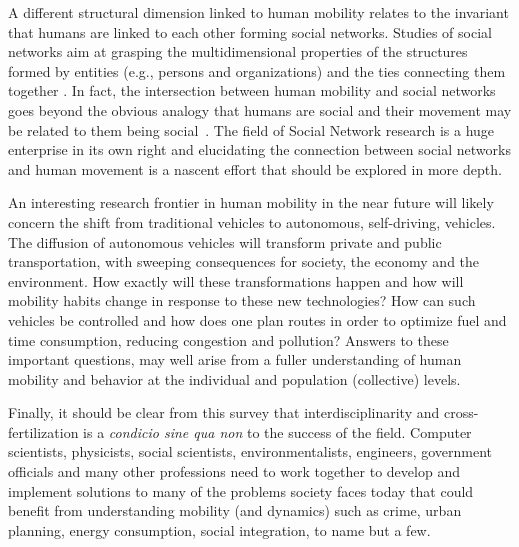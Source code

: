 A different structural dimension linked to human mobility relates to the invariant that humans are linked to each other forming social networks. Studies of social networks aim at grasping the multidimensional properties of the structures formed by entities (e.g., persons and organizations) and the ties connecting them together \cite{wasserman_1994_social}. In fact, the intersection between human mobility and social networks goes beyond the obvious analogy that humans are social and their movement may be related to them being social~\cite{wellman_1979_networks,tilly_1990_transplanted,liljeros_2001_web,tassier_2008_social,barabasi_2013_network}. The field of Social Network research is a huge enterprise in its own right and elucidating the connection between social networks and human movement is a nascent effort that should be explored in more depth. 

An interesting research frontier in human mobility in the near future will likely concern the shift from traditional vehicles to autonomous, self-driving, vehicles. The diffusion of autonomous vehicles will transform private and public transportation, with sweeping consequences for society, the economy and the environment.
How exactly will these transformations happen and how will mobility habits change in response to these new technologies?
How can such vehicles be controlled and how does one plan routes in order to optimize fuel and time consumption, reducing congestion and pollution?
Answers to these important questions, may well arise from a fuller understanding of human mobility and behavior at the individual and population (collective) levels. 

Finally, it should be clear from this survey that interdisciplinarity and cross-fertilization is a {\it condicio sine qua non} to the success of the field. Computer scientists, physicists, social scientists, environmentalists, engineers, government officials and many other professions need to work together to develop and implement solutions to many of the problems society faces today that could benefit from understanding mobility (and dynamics) such as crime, urban planning, energy consumption, social integration, to name but a few.